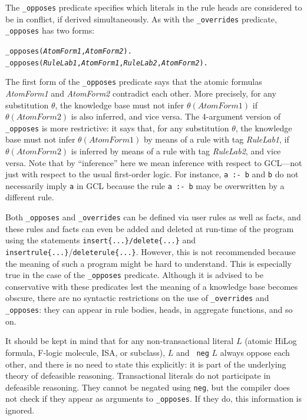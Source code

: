 \documentclass[11pt]{article}
\begin{document}
The {\tt \_opposes} predicate specifies which literals in the rule heads
are considered to be in conflict, if derived simultaneously. As with the
{\tt \_overrides} predicate, {\tt \_opposes} has two forms:
\begin{alltt}
  _opposes({\em{}AtomForm1},\emph{AtomForm2}).
  _opposes({\em{}RuleLab1},{\em{}AtomForm1},{\em{}RuleLab2},\emph{AtomForm2}).
\end{alltt}
The first form of the {\tt \_opposes} predicate says that the atomic
formulas \emph{AtomForm1} and \emph{AtomForm2} contradict each other.  More
precisely, for any substitution $\theta$, the knowledge
base must not infer $\theta(AtomForm1)$ if $\theta(AtomForm2)$ is also
inferred, and vice versa.  The 4-argument version of {\tt \_opposes} is
more restrictive: it says that, for any substitution $\theta$, the
knowledge base must not infer $\theta(AtomForm1)$ by means of a rule with
tag \emph{RuleLab1}, if $\theta(AtomForm2)$ is inferred by means of a
rule with tag \emph{RuleLab2}, and vice versa.
Note that by ``inference'' here we mean inference with respect to GCL---not just
with respect to the usual first-order logic. For instance, {\tt a :- b} and
{\tt b} do not necessarily imply {\tt a} in GCL because the rule {\tt a :-
  b} may be overwritten by a different rule.      

Both {\tt \_opposes} and {\tt \_overrides} can be defined via user rules
as well as facts, and these rules and facts can even be added and deleted
at run-time of the program using the statements {\tt insert\{...\}/delete\{...\}} and {\tt
  insertrule\{...\}}/{\tt deleterule\{...\}}.
However, this is not recommended because the meaning of such a
program might be hard to understand. This is especially true in the case of
the {\tt \_opposes} predicate.  Although it is advised
to be conservative with these predicates lest the meaning of a knowledge
base becomes obscure, there are no syntactic restrictions on the use of
{\tt \_overrides} and {\tt \_opposes}: they can appear in rule bodies,
heads, in aggregate functions, and so on.  

It should be kept in mind that for any non-transactional literal $L$
(atomic HiLog formula, F-logic molecule, ISA, or subclass), $L$ and {\tt
  neg} $L$ always oppose each other, and there is no need to state this
explicitly: it is part of the underlying theory of defeasible reasoning.
Transactional literals do not participate in defeasible reasoning.
They cannot be negated using {\tt neg}, but the compiler does not check if
they appear as arguments to {\tt \_opposes}. If they do, this information
is ignored.
\end{document}
